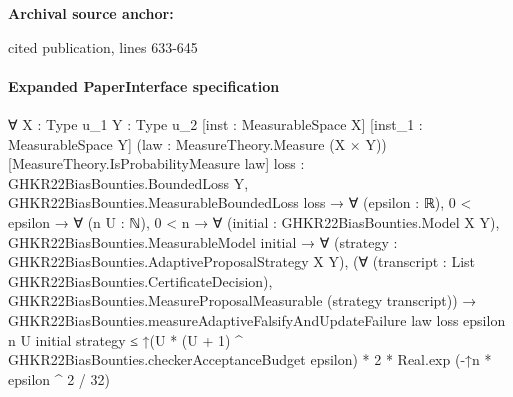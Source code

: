 \documentclass[10pt]{article}
\begin{document}
\textbf{Archival source anchor:} {\footnotesize\raggedright cited publication, lines 633-\allowbreak{}645\par}
\paragraph{Expanded PaperInterface specification}
\begin{ReviewVerbatim}
∀ {X : Type u_1} {Y : Type u_2} [inst : MeasurableSpace X] [inst_1 : MeasurableSpace Y]
  (law : MeasureTheory.Measure (X × Y)) [MeasureTheory.IsProbabilityMeasure law]
  {loss : GHKR22BiasBounties.BoundedLoss Y},
  GHKR22BiasBounties.MeasurableBoundedLoss loss →
    ∀ (epsilon : ℝ),
      0 < epsilon →
        ∀ (n U : ℕ),
          0 < n →
            ∀ (initial : GHKR22BiasBounties.Model X Y),
              GHKR22BiasBounties.MeasurableModel initial →
                ∀ (strategy : GHKR22BiasBounties.AdaptiveProposalStrategy X Y),
                  (∀ (transcript : List GHKR22BiasBounties.CertificateDecision),
                      GHKR22BiasBounties.MeasureProposalMeasurable (strategy transcript)) →
                    GHKR22BiasBounties.measureAdaptiveFalsifyAndUpdateFailure law loss epsilon n U initial strategy ≤
                      ↑(U * (U + 1) ^ GHKR22BiasBounties.checkerAcceptanceBudget epsilon) * 2 *
                        Real.exp (-↑n * epsilon ^ 2 / 32)
\end{ReviewVerbatim}
\end{document}
